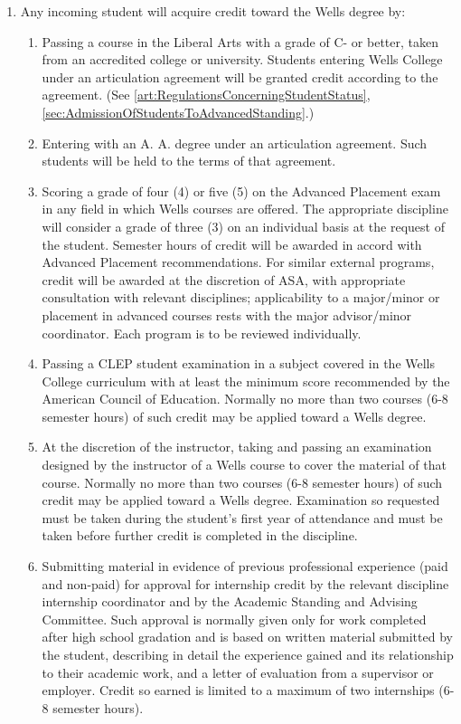 \documentclass{manual}
\newcommand{\modified}[1]{}
\newcommand{\itemLevelA}{\alph*.}
\newcommand{\itemLevelB}{\arabic*)}
\newcommand{\itemRefA}{\alph*}
\newcommand{\itemRefB}{\arabic*}
\begin{document}
\begin{enumerate}[label=\itemLevelA,ref=\itemRefA]
\item \label{iitem:incomingCredit} Any incoming student will acquire credit toward the Wells degree by:

\begin{enumerate}[label=\itemLevelB,ref=\itemRefB]
\item \label{iitem:passing} Passing \modified{9/14/99} a course in the Liberal Arts with a grade of C- or better, taken from an accredited college or university. Students entering Wells College under an articulation agreement will be granted credit according to the agreement. (See \cref{art:RegulationsConcerningStudentStatus}, \cref{sec:AdmissionOfStudentsToAdvancedStanding}.)
\item \label{iitem:articulation} Entering with an A. A. degree under an articulation agreement. Such students will be held to the terms of that agreement.
\item \label{iitem:ap} Scoring a grade of four (4) or five (5) on the Advanced Placement exam in any field in which Wells courses are offered. The appropriate discipline will consider a grade of three (3) on an individual basis at the request of the student. Semester hours of credit will be awarded in accord with Advanced Placement recommendations. For similar external\modified{11/14/95} programs, credit will be awarded at the discretion of ASA, with appropriate consultation with relevant disciplines; applicability to a major/minor or placement in advanced courses rests with the major advisor/minor coordinator. Each program is to be reviewed individually.
\item \label{iitem:clep} Passing a CLEP student examination in a subject covered in the Wells College curriculum with at least the minimum score recommended by the American Council of Education. Normally no more than two courses (6-8 semester hours) of such credit may be applied toward a Wells degree.
\item \label{iitem:placement} At the discretion \modified{5/8/90}of the instructor, taking and passing an examination designed by the instructor of a Wells course to cover the material of that course. Normally no more than two courses (6-8 semester hours) of such credit may be applied toward a Wells degree. Examination so requested must be taken during the student's first year of attendance and must be taken before further credit is completed in the discipline.
\item \label{iitem:professional} Submitting material \modified{5/13/93} in evidence of previous professional experience (paid and non-paid) for approval for internship credit by the relevant discipline internship coordinator and by the Academic Standing and Advising Committee. Such approval is normally given only for work completed after high school gradation and is based on written material submitted by the student, describing in detail the experience gained and its relationship to their academic work, and a letter of evaluation from a supervisor or employer. Credit so earned is limited to a maximum of two internships (6-8 semester hours).

\end{enumerate}
\end{enumerate}
\end{document}
